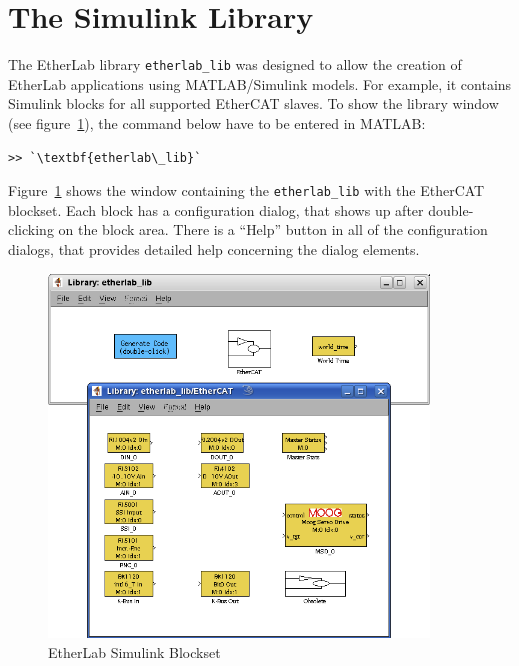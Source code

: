 
\section{The Simulink Library}
\label{sec:lib}

The EtherLab library \texttt{etherlab\_lib} was designed to allow the creation
of EtherLab applications using MATLAB/Simulink models. For example, it
contains Simulink blocks for all supported EtherCAT slaves. To show the
library window (see figure~\ref{fig:blockset}), the command below have to be
entered in MATLAB:

\begin{lstlisting}[gobble=2]
  >> `\textbf{etherlab\_lib}`
\end{lstlisting}

Figure~\ref{fig:blockset} shows the window containing the
\texttt{etherlab\_lib} with the EtherCAT blockset. Each block has a
configuration dialog, that shows up after double-clicking on the block area.
There is a ``Help'' button in all of the configuration dialogs, that provides
detailed help concerning the dialog elements.

\begin{figure}[H]
  \begin{center}
    \includegraphics[width=0.9\textwidth]{images/blockset.png}
    \caption{EtherLab Simulink Blockset}
    \label{fig:blockset}
  \end{center}
\end{figure}

